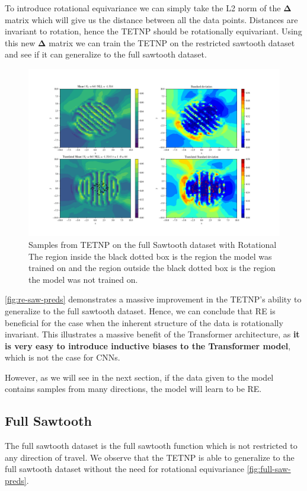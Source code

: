 \documentclass[../../main.tex]{subfiles}
\begin{document}
To introduce rotational equivariance we can simply take the L2 norm of the $\bm{\Delta}$ matrix which will give us the distance between all the data points. Distances are invariant to rotation, hence the TETNP should be rotationally equivariant. Using this new $\bm{\Delta}$ matrix we can train the TETNP on the restricted sawtooth dataset and see if it can generalize to the full sawtooth dataset.


\begin{figure}[H]
    \centering
    \includegraphics[width=0.8\linewidth]{./fig/res-saw/re.png}
    \caption{Samples from TETNP on the full Sawtooth dataset with Rotational 
    The region inside the black dotted box is the region the model was trained on and the region outside the black dotted box is the region the model was not trained on.}
    \label{fig:re-saw-preds}
\end{figure}

\autoref{fig:re-saw-preds} demonstrates a massive improvement in the TETNP's ability to generalize to the full sawtooth dataset. Hence, we can conclude that RE is beneficial for the case when the inherent structure of the data is rotationally invariant. This illustrates a massive benefit of the Transformer architecture, as \textbf{it is very easy to introduce inductive biases to the Transformer model}, which is not the case for CNNs.

However, as we will see in the next section, if the data given to the model contains samples from many directions, the model will learn to be RE.

\subsection{Full Sawtooth}

The full sawtooth dataset is the full sawtooth function which is not restricted to any direction of travel. We observe that the TETNP is able to generalize to the full sawtooth dataset without the need for rotational equivariance \autoref{fig:full-saw-preds}. 
\end{document}
